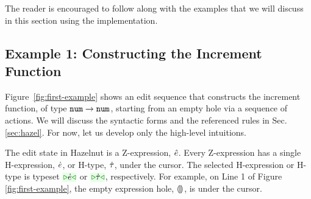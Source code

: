 The reader is encouraged to follow along with the examples that we will discuss in this section using the implementation.

%
\subsection{Example 1: Constructing the Increment Function}

Figure~\ref{fig:first-example} shows an edit sequence that constructs the increment function, of type $\texttt{num} \rightarrow \texttt{num}$, starting from an empty hole via a sequence of {actions}. We will discuss the syntactic forms and the referenced rules in Sec. \ref{sec:hazel}. For now, let us develop only the high-level intuitions. 



The edit state in Hazelnut is a {Z-expression}, $\hat{e}$. Every Z-expression has a single {H-expression}, $\dot{e}$, or {H-type}, $\dot{\tau}$, under the {cursor}. The selected H-expression or H-type is typeset $\zwsel{\hexp}$ or $\zwsel{\htau}$, respectively. For example, on Line 1 of Figure \ref{fig:first-example}, the empty expression hole, $\llparenthesis\rrparenthesis$, is under the cursor. 

